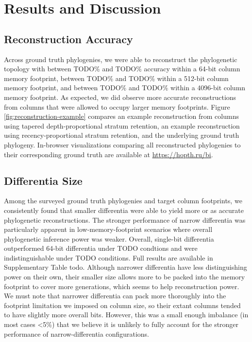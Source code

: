 \section{Results and Discussion} \label{sec:results}

\subsection{Reconstruction Accuracy}



Across ground truth phylogenies, we were able to reconstruct the phylogenetic topology with between TODO\% and TODO\% accuracy within a 64-bit column memory footprint, between TODO\% and TODO\% within a 512-bit column memory footprint, and between TODO\% and TODO\% within a 4096-bit column memory footprint.
As expected, we did observe more accurate reconstructions from columns that were allowed to occupy larger memory footprints.
Figure \ref{fig:reconstruction-example} compares an example reconstruction from columns using tapered depth-proportional stratum retention, an example reconstruction using recency-proportional stratum retention,  and the underlying ground truth phylogeny.
In-browser visualizations comparing all reconstructed phylogenies to their corresponding ground truth are available at \url{https://hopth.ru/bi}.

\subsection{Differentia Size}

Among the surveyed ground truth phylogenies and target column footprints, we consistently found that smaller differentia were able to yield more or as accurate phylogenetic reconstructions.
The stronger performance of narrow differentia was particularly apparent in low-memory-footprint scenarios where overall phylogenetic inference power was weaker.
Overall, single-bit differentia outperformed 64-bit differentia under TODO condtions and were indistinguishable under TODO conditions.
Full results are available in Supplementary Table todo.
Although narrower differentia have less distinguishing power on their own, their smaller size allows more to be packed into the memory footprint to cover more generations, which seems to help reconstruction power.
We must note that narrower differentia can pack more thoroughly into the footprint limitation we imposed on column size, so their extant columns tended to have slightly more overall bits.
However, this was a small enough imbalance (in most cases <5\%) that we believe it is unlikely to fully account for the stronger performance of narrow-differentia configurations.

